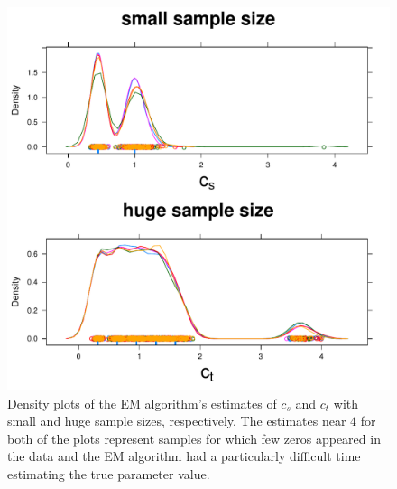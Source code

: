 \begin{figure}
  \centering
  \includegraphics[scale=0.5]{em.pdf}
  \caption{Density plots of the EM algorithm's estimates of $c_s$ and $c_t$ with small and huge sample sizes, respectively.  The estimates near $4$ for both of the plots represent samples for which few zeros appeared in the data and the EM algorithm had a particularly difficult time estimating the true parameter value.}
  \label{fig:em}
\end{figure}










